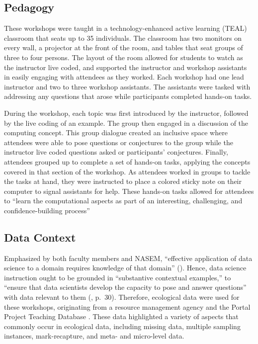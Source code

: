 \documentclass[12pt]{article}
\begin{document}

\subsection{Pedagogy}

\noindent These workshops were taught in a technology-enhanced active learning
(TEAL) classroom that seats up to 35 individuals. The classroom has two monitors
on every wall, a projector at the front of the room, and tables that seat groups
of three to four persons. The layout of the room allowed for students to
watch as the instructor live coded, and supported the instructor and workshop
assistants in easily engaging with attendees as they worked. Each workshop had
one lead instructor and two to three workshop assistants. The assistants were
tasked with addressing any questions that arose while participants completed 
hands-on tasks. 

During the workshop, each topic was first introduced by the instructor, 
followed by the live coding of an example. The group then engaged in a
discussion of the computing concept. This group dialogue created an inclusive
space where attendees were able to pose questions or conjectures to the group
while the instructor live coded questions asked or participants' conjectures.
Finally, attendees grouped up to complete a set of hands-on tasks, applying the
concepts covered in that section of the workshop. As
attendees worked in groups to tackle the tasks at hand, they were instructed to
place a colored sticky note on their computer to signal assistants for help.
These hands-on tasks allowed
for attendees to ``learn the computational aspects as part of an interesting,
challenging, and confidence-building process'' \citep[p.\ 101]{nolan}

\subsection{Data Context}  

\noindent Emphasized by both faculty members and NASEM, ``effective
application of data science to a domain requires knowledge of that domain'' 
(\citeyear[p.\ 29]{nas}). Hence, data science instruction ought to be grounded
in ``substantive contextual examples,'' to ``ensure that data scientists develop
the capacity to pose and answer questions'' with data relevant to them
(\citeyear{nas}, p.\ 30). Therefore, ecological data were used for these
workshops, originating from a resource management agency and the
Portal Project Teaching Database \citep{portal_data}.  
These data highlighted a variety of aspects that commonly occur in ecological
data, including missing data, multiple sampling instances,
mark-recapture, and meta- and micro-level data. 
\end{document}
